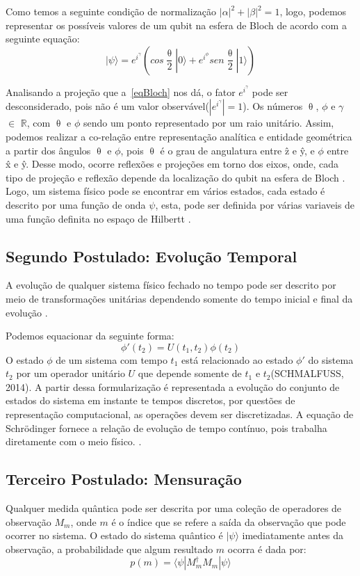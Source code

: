 \documentclass[tcc,capa]{texufpel}
\begin{document}
Como temos a seguinte condição de normalização  $|\alpha|^2 + |\beta|^2=1$, logo, podemos representar os possíveis valores de um qubit na esfera de Bloch de acordo com a seguinte equação:
\begin{equation}
    |\psi\rangle= e^i^\gamma(cos\frac{\uptheta}{2}|0\rangle + e^i^\phi sen\frac{\uptheta}{2}|1\rangle )
    \label{eqBloch}
\end{equation}

Analisando a projeção que a~\ref{eqBloch} nos dá, o fator $e^i^\gamma$ pode ser desconsiderado, pois não é um valor observável($|e^i^\gamma|=1$). Os números $\uptheta$, $\phi$ e $\gamma$ $\in$ $\mathbb{R}$,  com $\uptheta$ e $\phi$ sendo um ponto representado por um raio unitário. Assim, podemos realizar a co-relação entre representação analítica e entidade geométrica a partir dos ângulos $\uptheta$ e $\phi$, pois $\uptheta$ é o grau de angulatura entre \^{z} e \^{y}, e $\phi$ entre \^{x} e \^{y}. Desse modo, ocorre reflexões e projeções em torno dos eixos, onde, cada tipo de projeção e reflexão depende da localização do qubit na esfera de Bloch \cite{chuang00a}. 
Logo, um sistema físico pode se encontrar em vários estados, cada estado é descrito por uma função de onda $\psi$, esta, pode ser definida por várias variaveis de uma função definita no espaço de Hilbertt \cite{courteille2014mecanica}.
\subsection{Segundo Postulado: Evolução Temporal}
A evolução de qualquer sistema físico fechado no tempo pode ser descrito por meio de transformações unitárias dependendo somente do tempo inicial e final da evolução \cite{imre2005quantum}.

Podemos equacionar da seguinte forma: 
\begin{equation}
    \phi'(t_2)= U(t_1,t_2)\phi(t_2)
\end{equation}
O estado $\phi$ de um sistema com tempo $t_1$ está relacionado ao estado $\phi'$ do sistema  $t_2$ por um operador unitário $U$ que depende somente de $t_1$ e $t_2$(SCHMALFUSS, 2014). 
A partir dessa formularização é representada a evolução do conjunto de estados do sistema em instante te tempos discretos, por questões de representação computacional, as operações devem ser discretizadas. A equação de Schrödinger fornece a relação de evolução de tempo contínuo, pois trabalha diretamente com o meio físico. \cite{imre2005quantum}.

\subsection{Terceiro Postulado: Mensuração}
Qualquer medida quântica pode ser descrita por uma coleção de operadores de observação $M_m$, onde $m$ é o índice que se refere a saída da observação que pode ocorrer no sistema. O estado do sistema quântico é $|\psi\rangle$ imediatamente antes da observação, a probabilidade que algum resultado $m$ ocorra é dada por:
\begin{equation}
    p(m)= \langle\psi|M^\dagger_mM_m|\psi\rangle
\end{equation}
\end{document}
